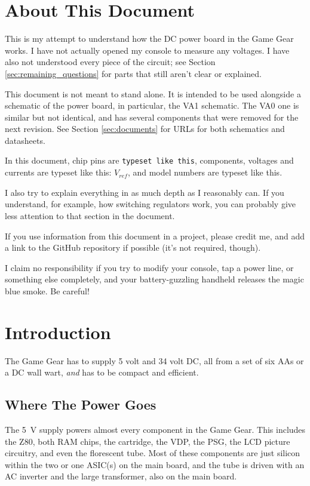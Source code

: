 \documentclass{article}
\newcommand{\Vref}{$V_{ref}$}
\newcommand{\chippin}{\texttt}
\newcommand{\model}{\textsf}
\begin{document}
\section{About This Document}
This is my attempt to understand how the DC power board in the Game
Gear works. I have not actually opened my console to measure any
voltages. I have also not understood every piece of the circuit; see
Section \ref{sec:remaining_questions} for parts that still aren't
clear or explained.

This document is not meant to stand alone. It is intended to be used
alongside a schematic of the power board, in particular, the
\model{VA1} schematic. The \model{VA0} one is similar but not
identical, and has several components that were removed for the next
revision. See Section \ref{sec:documents} for URLs for both schematics
and datasheets.

In this document, chip pins are \chippin{typeset like this},
components, voltages and currents are typeset like this:
\Vref{}, and model numbers are \model{typeset like this}.

I also try to explain everything in as much depth as I reasonably
can. If you understand, for example, how switching regulators work,
you can probably give less attention to that section in the document.

If you use information from this document in a project, please credit
me, and add a link to the GitHub repository if possible (it's not
required, though).

I claim no responsibility if you try to modify your console, tap a
power line, or something else completely, and your battery-guzzling
handheld releases the magic blue smoke. Be careful!

\section{Introduction}
The Game Gear has to supply 5 volt and 34 volt DC, all from a set of
six AAs or a DC wall wart, \textit{and} has to be compact and
efficient.

\subsection{Where The Power Goes}
The \qty{5}{\volt} supply powers almost every component in the Game
Gear. This includes the \model{Z80}, both RAM chips, the cartridge, the VDP,
the PSG, the LCD picture circuitry, and even the florescent tube. Most
of these components are just silicon within the two or one ASIC(s) on the
main board, and the tube is driven with an AC inverter and the large
transformer, also on the main board.
\end{document}

